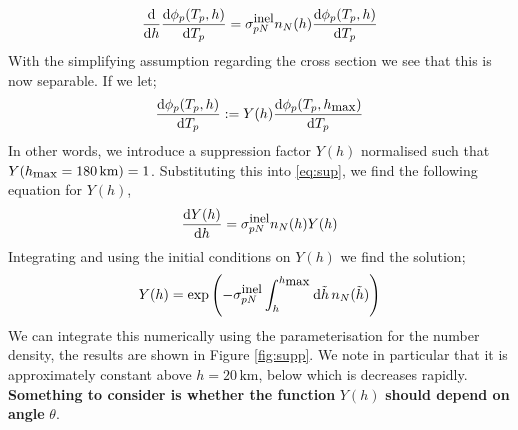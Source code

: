 \documentclass[10pt]{article}
\begin{document}
\begin{equation}
  \label{eq:sup}
  \frac{\text{d}}{\text{d} h}\frac{\text{d} \phi_p(T_p, h)}{\text{d} T_p} = \sigma_{pN}^{\textrm{\small inel}}n_N(h)\frac{\text{d} \phi_p(T_p, h)}{\text{d} T_p}
\end{equation}
With the simplifying assumption regarding the cross section we see that this is now separable. If we let;
\begin{equation}
  \frac{\text{d} \phi_p(T_p, h)}{\text{d} T_p} := Y(h)\frac{\text{d}\phi_p(T_p, h_{\textrm{\small max}})}{\text{d} T_p}
\end{equation}
In other words, we introduce a suppression factor $Y(h)$ normalised such that $Y(h_{\textrm{\small max}} = 180\,\textrm{km}) = 1$. Substituting this into \eqref{eq:sup}, we find the following equation for $Y(h)$,
\begin{equation}
  \frac{\text{d} Y(h)}{\text{d} h} = \sigma_{pN}^{\textrm{\small inel}} n_N(h) Y(h)
\end{equation}
Integrating and using the initial conditions on $Y(h)$ we find the solution;
\begin{equation}
  Y(h) = \exp\left(-\sigma_{pN}^{\textrm{\small inel}}\int_{h}^{h_{\textrm{\small max}}}{\text{d}\tilde{h} \, n_N(\tilde{h})}\right)
\end{equation}
We can integrate this numerically using the parameterisation for the number density, the results are shown in Figure \ref{fig:supp}. We note in particular that it is approximately constant above $h = 20 \, \textrm{km}$, below which is decreases rapidly. \textbf{Something to consider is whether the function} $Y(h)$ \textbf{should depend on angle} $\theta$.
\end{document}
